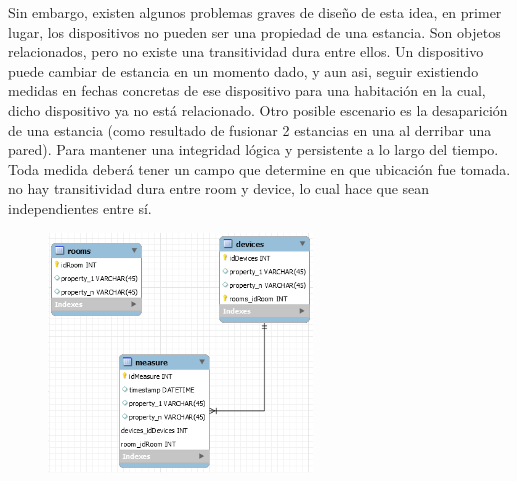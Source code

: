 Sin embargo, existen algunos problemas graves de diseño de esta idea, en primer lugar, los dispositivos no pueden ser una propiedad de una estancia. Son objetos relacionados, pero no existe una transitividad dura entre ellos. Un dispositivo puede cambiar de estancia en un momento dado, y aun asi, seguir existiendo medidas en fechas concretas de ese dispositivo para una habitación en la cual, dicho dispositivo ya no está relacionado. Otro posible escenario es la desaparición de una estancia (como resultado de fusionar 2 estancias en una al derribar una pared). Para mantener una integridad lógica y persistente a lo largo del tiempo. Toda medida deberá tener un campo que determine en que ubicación fue tomada.
no hay transitividad dura entre room y device, lo cual hace que sean independientes entre sí.


\begin{figure}[hbt!]
\centering
\includegraphics[height=2.5in]{figures/SQLSchemaExample_2.png}
\end{figure}

